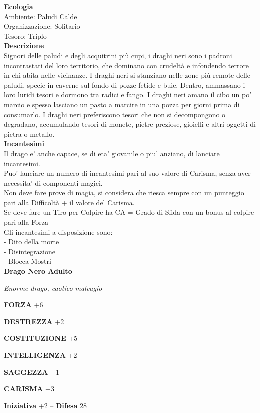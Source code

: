 \begin{multicols}{2}
\textbf{Ecologia}\\
Ambiente: Paludi Calde\\
Organizzazione: Solitario\\
Tesoro: Triplo\\
\textbf{Descrizione}\\
Signori delle paludi e degli acquitrini più cupi, i draghi neri sono i padroni incontrastati del loro territorio, che dominano con crudeltà e infondendo terrore in chi abita nelle vicinanze. I draghi neri si stanziano nelle zone più remote delle paludi, specie in caverne sul fondo di pozze fetide e buie. Dentro, ammassano i loro luridi tesori e dormono tra radici e fango. I draghi neri amano il cibo un po' marcio e spesso lasciano un pasto a marcire in una pozza per giorni prima di consumarlo. I draghi neri preferiscono tesori che non si decompongono o degradano, accumulando tesori di monete, pietre preziose, gioielli e altri oggetti di pietra o metallo.\\
\textbf{Incantesimi}\\
Il drago e' anche capace, se di eta' giovanile o piu' anziano, di lanciare incantesimi.\\
Puo' lanciare un numero di incantesimi pari al suo valore di Carisma, senza aver necessita' di componenti magici.\\
Non deve fare prove di magia, si considera che riesca sempre con un punteggio pari alla Difficoltà + il valore del Carisma.\\
Se deve fare un Tiro per Colpire ha CA = Grado di Sfida con un bonus al colpire pari alla Forza\\
Gli incantesimi a disposizione sono:\\
- Dito della morte\\
- Disintegrazione\\
- Blocca Mostri\\


\medskip{}\textbf{Drago Nero Adulto}

\emph{Enorme drago, caotico malvagio}

\textbf{FORZA} +6

\textbf{DESTREZZA} +2

\textbf{COSTITUZIONE} +5

\textbf{INTELLIGENZA} +2

\textbf{SAGGEZZA} +1

\textbf{CARISMA} +3

\textbf{Iniziativa} +2 -- \textbf{Difesa} 28


\end{multicols}
